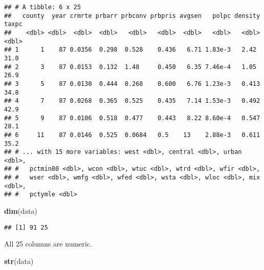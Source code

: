 \documentclass[]{article}
\newenvironment{Shaded}{\begin{snugshade}}{\end{snugshade}}
\newcommand{\KeywordTok}[1]{\textcolor[rgb]{0.13,0.29,0.53}{\textbf{#1}}}
\newcommand{\NormalTok}[1]{#1}
\begin{document}
\begin{verbatim}
## # A tibble: 6 x 25
##   county  year crmrte prbarr prbconv prbpris avgsen   polpc density taxpc
##    <dbl> <dbl>  <dbl>  <dbl>   <dbl>   <dbl>  <dbl>   <dbl>   <dbl> <dbl>
## 1      1    87 0.0356  0.298  0.528    0.436   6.71 1.83e-3   2.42   31.0
## 2      3    87 0.0153  0.132  1.48     0.450   6.35 7.46e-4   1.05   26.9
## 3      5    87 0.0130  0.444  0.268    0.600   6.76 1.23e-3   0.413  34.8
## 4      7    87 0.0268  0.365  0.525    0.435   7.14 1.53e-3   0.492  42.9
## 5      9    87 0.0106  0.518  0.477    0.443   8.22 8.60e-4   0.547  28.1
## 6     11    87 0.0146  0.525  0.0684   0.5    13    2.88e-3   0.611  35.2
## # ... with 15 more variables: west <dbl>, central <dbl>, urban <dbl>,
## #   pctmin80 <dbl>, wcon <dbl>, wtuc <dbl>, wtrd <dbl>, wfir <dbl>,
## #   wser <dbl>, wmfg <dbl>, wfed <dbl>, wsta <dbl>, wloc <dbl>, mix <dbl>,
## #   pctymle <dbl>
\end{verbatim}

\begin{Shaded}
\begin{Highlighting}[]
\KeywordTok{dim}\NormalTok{(data)}
\end{Highlighting}
\end{Shaded}

\begin{verbatim}
## [1] 91 25
\end{verbatim}

All 25 columns are numeric.

\begin{Shaded}
\begin{Highlighting}[]
\KeywordTok{str}\NormalTok{(data)}
\end{Highlighting}
\end{Shaded}
\end{document}
